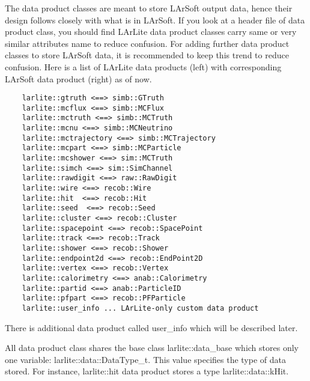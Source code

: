 The data product classes are meant to store LArSoft output data, hence their design follows closely with what is in LArSoft.
If you look at a header file of data product class, you should find LArLite data product classes carry same or very similar attributes name to reduce confusion.
For adding further data product classes to store LArSoft data, it is recommended to keep this trend to reduce confusion.
Here is a list of LArLite data products (left) with corresponding LArSoft data product (right) as of now.
\begin{lstlisting}
    larlite::gtruth <==> simb::GTruth
    larlite::mcflux <==> simb::MCFlux
    larlite::mctruth <==> simb::MCTruth
    larlite::mcnu <==> simb::MCNeutrino
    larlite::mctrajectory <==> simb::MCTrajectory
    larlite::mcpart <==> simb::MCParticle
    larlite::mcshower <==> sim::MCTruth
    larlite::simch <==> sim::SimChannel
    larlite::rawdigit <==> raw::RawDigit
    larlite::wire <==> recob::Wire
    larlite::hit  <==> recob::Hit
    larlite::seed  <==> recob::Seed
    larlite::cluster <==> recob::Cluster
    larlite::spacepoint <==> recob::SpacePoint
    larlite::track <==> recob::Track
    larlite::shower <==> recob::Shower
    larlite::endpoint2d <==> recob::EndPoint2D
    larlite::vertex <==> recob::Vertex
    larlite::calorimetry <==> anab::Calorimetry
    larlite::partid <==> anab::ParticleID
    larlite::pfpart <==> recob::PFParticle
    larlite::user_info ... LArLite-only custom data product
\end{lstlisting}
There is additional data product called {\ttfamily user\_info} which will be described later.

All data product class shares the base class {\ttfamily larlite::data\_base} which stores only one variable: {\ttfamily larlite::data::DataType\_t}. This \enum value specifies the type of data stored. For instance, {\ttfamily larlite::hit} data product stores a type {\ttfamily larlite::data::kHit}.

